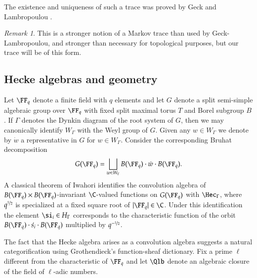 \documentclass[12pt]{amsart}
\theoremstyle{remark}
\newtheorem{remark}{Remark}
\begin{document}
The existence and uniqueness of such a trace was proved by Geck and Lambropoulou \cite{Geck,GL}.
\begin{remark}
  This is a stronger notion of a Markov trace than used by
  Geck-Lambropoulou, and stronger than necessary for topological
  purposes, but our trace will be of this form.
\end{remark}


\subsection{Hecke algebras and geometry}
\label{sec:hecke-algebr-geom}


Let $\FF_q$ denote a finite field with $q$ elements
and let $G$ denote a split semi-simple algebraic group over $\FF_q$
with fixed split maximal torus $T$ and Borel subgroup $B$. If $\Gamma$
denotes the Dynkin diagram of the root system of $G$, then we may
canonically identify $W_{\Gamma}$ with the Weyl group of $G$. Given any
$w \in W_{\Gamma}$ we denote by $\dot{w}$ a representative in $G$ for
$w \in W_{\Gamma}$. 
Consider the corresponding Bruhat decomposition
\[ G(\FF_q) = \bigsqcup_{w \in W_{\Gamma}} B(\FF_q) \cdot \dot{w} \cdot B(\FF_q). \] A classical
theorem of Iwahori identifies the convolution algebra of $B(\FF_q)
\times B(\FF_q)$-invariant $\C$-valued functions on $G(\FF_q)$ with $\Hec_{\Gamma}$, where
$q^{\nicefrac{1}{2}}$ is specialized at a fixed square root of $|\FF_q
| \in \C$. Under this identification the element $\si_i \in H_{\Gamma}$
corresponds to the characteristic function of the orbit $B(\FF_q)
\cdot \dot{s_i} \cdot B(\FF_q)$ multiplied by 
$q^{- \nicefrac{1}{2}}$.

The fact that the Hecke algebra arises as a convolution algebra
suggests a natural categorification using Grothendieck's
function-sheaf dictionary. Fix a prime $\ell$ different from the
characteristic of $\FF_q$ and let $\Qlb$ denote an algebraic
closure of the field of $\ell$-adic numbers.
\end{document}
